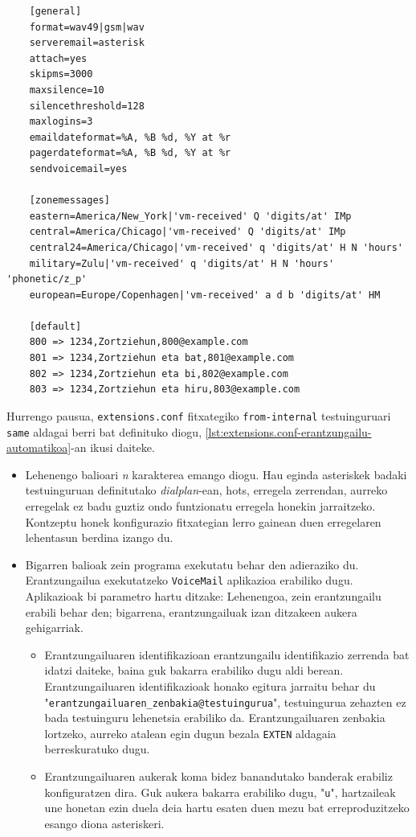 \begin{listing}
    \begin{verbatim}
    [general]
    format=wav49|gsm|wav
    serveremail=asterisk
    attach=yes
    skipms=3000
    maxsilence=10
    silencethreshold=128
    maxlogins=3
    emaildateformat=%A, %B %d, %Y at %r
    pagerdateformat=%A, %B %d, %Y at %r
    sendvoicemail=yes
    
    [zonemessages]
    eastern=America/New_York|'vm-received' Q 'digits/at' IMp
    central=America/Chicago|'vm-received' Q 'digits/at' IMp
    central24=America/Chicago|'vm-received' q 'digits/at' H N 'hours'
    military=Zulu|'vm-received' q 'digits/at' H N 'hours' 'phonetic/z_p'
    european=Europe/Copenhagen|'vm-received' a d b 'digits/at' HM

    [default]
    800 => 1234,Zortziehun,800@example.com
    801 => 1234,Zortziehun eta bat,801@example.com
    802 => 1234,Zortziehun eta bi,802@example.com
    803 => 1234,Zortziehun eta hiru,803@example.com
    \end{verbatim}
    \caption{Erantzungailu automatikoen konfigurazioa voicemail.conf fitxategian}
    \label{lst:voicemail.conf-erantzungailu-automatikoa}
\end{listing}

Hurrengo pausua, \texttt{extensions.conf} fitxategiko \texttt{from-internal} testuinguruari \texttt{same} aldagai berri bat definituko diogu, \autoref{lst:extensions.conf-erantzungailu-automatikoa}-an ikusi daiteke.
\begin{itemize}
    \item Lehenengo balioari \textit{n} karakterea emango diogu. Hau eginda asteriskek badaki testuinguruan definitutako \textit{dialplan}-ean, hots, erregela zerrendan, aurreko erregelak ez badu guztiz ondo funtzionatu erregela honekin jarraitzeko. Kontzeptu honek konfigurazio fitxategian lerro gainean duen erregelaren lehentasun berdina izango du.
    \item Bigarren balioak zein programa exekutatu behar den adieraziko du. Erantzungailua exekutatzeko \texttt{VoiceMail} aplikazioa erabiliko dugu. Aplikazioak bi parametro hartu ditzake: Lehenengoa, zein erantzungailu erabili behar den; bigarrena, erantzungailuak izan ditzakeen aukera gehigarriak.
    \begin{itemize}
        \item Erantzungailuaren identifikazioan erantzungailu identifikazio zerrenda bat idatzi daiteke, baina guk bakarra erabiliko dugu aldi berean. Erantzungailuaren identifikazioak honako egitura jarraitu behar du "\texttt{erantzungailuaren_zenbakia@testuingurua}", testuingurua zehazten ez bada testuinguru lehenetsia erabiliko da. Erantzungailuaren zenbakia lortzeko, aurreko atalean egin dugun bezala \texttt{EXTEN} aldagaia berreskuratuko dugu.
        \item Erantzungailuaren aukerak koma bidez banandutako banderak erabiliz konfiguratzen dira. Guk aukera bakarra erabiliko dugu, "\texttt{u}", hartzaileak une honetan ezin duela deia hartu esaten duen mezu bat erreproduzitzeko esango diona asteriskeri.
    \end{itemize}
\end{itemize}

